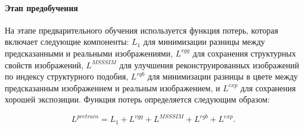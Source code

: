 \paragraph{Этап предобучения}

На этапе предварительного обучения используется функция потерь, которая включает следующие компоненты: $L_1$ для минимизации разницы между предсказанными и реальными изображениями, $L^{vgg}$ для сохранения структурных свойств изображений, $L^{MSSSIM}$ для улучшения реконструированных изображений по индексу структурного подобия, $L^{rgb}$ для минимизации разницы в цвете между предсказанным изображением и реальным изображением, и $L^{exp}$ для сохранения хорошей экспозиции. Функция потерь определяется следующим образом:

\begin{equation}
    \label{eq:2-1-3-5}
    L^{pretrain} = L_1 + L^{vgg} + L^{MSSSIM} + L^{rgb} + L^{exp}.
\end{equation}
